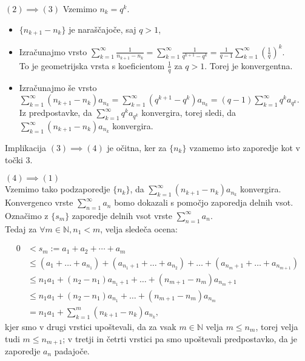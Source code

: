\documentclass[a4paper,12pt]{article}
\def\N{\mathbb{N}} %
\begin{document}
\noindent
$(2) \implies (3)$ Vzemimo ${n_k} = q^k$.\\

\begin{itemize}
    \item $\{n_{k+1} - n_k\}$ je naraščajoče, saj $ q > 1$,
    \item Izračunajmo vrsto
    $\sum_{k = 1}^{\infty}{\frac{1}{n_{k+1} - n_k}} = 
    \sum_{k = 1}^{\infty}{\frac{1}{q^{k + 1} - q^k}} =
    \frac{1}{q - 1}\sum_{k = 1}^{\infty}{(\frac{1}{q})^k}$.\\
    To je geometrijska vrsta s koeficientom $\frac{1}{q}$ za $q > 1$. Torej je konvergentna.
    \item Izračunajmo še vrsto $\sum_{k = 1}^{\infty}{(n_{k+1} - n_k)a_{n_k}} =
    \sum_{k = 1}^{\infty}{(q^{k + 1} - q^k)}a_{n_k} =
    (q - 1)\sum_{k = 1}^{\infty}{q^ka_{q^k}}$.\\
    Iz predpostavke, da $\sum_{k = 1}^{\infty}{q^ka_{q^k}}$ konvergira, torej sledi,
    da $\sum_{k = 1}^{\infty}{(n_{k+1} - n_k)a_{n_k}}$ konvergira.
\end{itemize}


\noindent
Implikacija $(3) \implies (4)$ je očitna, ker za $\{n_k\}$ vzamemo isto zaporedje kot v točki 3.

\noindent
$(4) \implies (1)$\\
Vzemimo tako podzaporedje  $\{n_k\}$, da $\sum_{k = 1}^{\infty}{(n_{k+1} - n_k)a_{n_k}}$ konvergira.
Konvergenco vrste $\sum_{n = 1}^{\infty}{a_n}$ bomo dokazali s pomočjo zaporedja delnih vsot.
Označimo z $\{s_m\}$ zaporedje delnih vsot vrste $\sum_{n = 1}^{\infty}{a_n}$.\\
Tedaj za $\forall m \in \N, n_1 < m$, velja sledeča ocena:

\[
    \begin{split}
        0 & < s_m := a_1 + a_2 + \cdots + a_m \\
        & \leq (a_1 + \ldots + a_{n_1}) + (a_{n_{1} + 1} + \ldots + a_{n_{2}})
        + \ldots  + (a_{n_{m} + 1} + \ldots + a_{n_{m+1}})\\
        & \leq n_{1}a_{1} + (n_2 - n_1)a_{n_{1} + 1} + \ldots + (n_{m+1} - n_m)a_{n_{m}+1}\\
        & \leq n_{1}a_{1} + (n_2 - n_1)a_{n_1} + \ldots + (n_{m+1} - n_{m})a_{n_{m}}\\
        & = n_{1}a_{1} + \sum_{k = 1}^{m}{(n_{k+1} - n_k)a_{n_k}} \text{,}
    \end{split}
\]
kjer smo v drugi vrstici upoštevali, da za vsak $m \in \N$ velja $m \leq n_m$, 
torej velja tudi $m \leq n_{m + 1}$; v tretji in četrti vrstici pa smo upoštevali predpostavko,
da je zaporedje $a_n$ padajoče.
\end{document}
